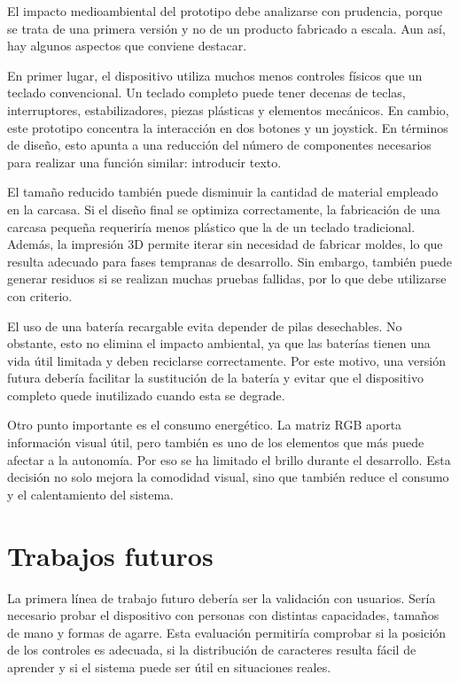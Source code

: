 El impacto medioambiental del prototipo debe analizarse con prudencia, porque se trata de una primera versión y no de un producto fabricado a escala. Aun así, hay algunos aspectos que conviene destacar.

En primer lugar, el dispositivo utiliza muchos menos controles físicos que un teclado convencional. Un teclado completo puede tener decenas de teclas, interruptores, estabilizadores, piezas plásticas y elementos mecánicos. En cambio, este prototipo concentra la interacción en dos botones y un joystick. En términos de diseño, esto apunta a una reducción del número de componentes necesarios para realizar una función similar: introducir texto.

El tamaño reducido también puede disminuir la cantidad de material empleado en la carcasa. Si el diseño final se optimiza correctamente, la fabricación de una carcasa pequeña requeriría menos plástico que la de un teclado tradicional. Además, la impresión 3D permite iterar sin necesidad de fabricar moldes, lo que resulta adecuado para fases tempranas de desarrollo. Sin embargo, también puede generar residuos si se realizan muchas pruebas fallidas, por lo que debe utilizarse con criterio.

El uso de una batería recargable evita depender de pilas desechables. No obstante, esto no elimina el impacto ambiental, ya que las baterías tienen una vida útil limitada y deben reciclarse correctamente. Por este motivo, una versión futura debería facilitar la sustitución de la batería y evitar que el dispositivo completo quede inutilizado cuando esta se degrade.

Otro punto importante es el consumo energético. La matriz RGB aporta información visual útil, pero también es uno de los elementos que más puede afectar a la autonomía. Por eso se ha limitado el brillo durante el desarrollo. Esta decisión no solo mejora la comodidad visual, sino que también reduce el consumo y el calentamiento del sistema.

\section{Trabajos futuros}
\label{sec:trabajos-futuros}

La primera línea de trabajo futuro debería ser la validación con usuarios. Sería necesario probar el dispositivo con personas con distintas capacidades, tamaños de mano y formas de agarre. Esta evaluación permitiría comprobar si la posición de los controles es adecuada, si la distribución de caracteres resulta fácil de aprender y si el sistema puede ser útil en situaciones reales.

